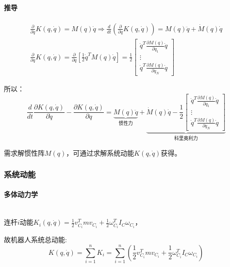 \documentclass[
12pt, %
a4paper, 
oneside, %
headinclude,footinclude, %
]{scrartcl}
\begin{document}
\paragraph{推导}
\begin{align*}
\frac{\partial}{\partial\dot{q}}K(q, \dot{q}) = M(q)\dot{q} \Rightarrow \frac{d}{d t}(\frac{\partial}{\partial\dot{q}}K(q, \dot{q})) = M(q)\ddot{q} + \dot{M}(q)\dot{q} \\
\frac{\partial}{\partial q}K(q,\dot{q}) = \frac{\partial}{\partial q}[\frac{1}{2}\dot{q}^T M(q)\dot{q}] = \frac{1}{2} \begin{bmatrix} \dot{q}^T\frac{\partial M(q)}{\partial q_1}\dot{q} \\ \vdots \\ \dot{q}^T\frac{\partial M(q)}{\partial q_N}\dot{q} \end{bmatrix}
\end{align*}

所以：
$$ \frac{d}{dt}\frac{\partial K(q,\dot{q})}{\partial\dot{q}} - \frac{\partial K(q,\dot{q})}{\partial q} = \underbrace{M(q)\ddot{q}}_{\text{惯性力}} + \underbrace{\dot{M}(q)\dot{q} - \frac{1}{2}\begin{bmatrix} \dot{q}^T\frac{\partial M(q)}{\partial q_1}\dot{q} \\ \vdots \\ \dot{q}^T\frac{\partial M(q)}{\partial q_N}\dot{q} \end{bmatrix}}_{\text{科里奥利力}} $$

需求解惯性阵$ M(q) $，可通过求解系统动能$ K(q, \dot{q}) $获得。
\subsubsection{系统动能}
\paragraph{多体动力学}~\\

连杆$ i $动能$ K_i(q, \dot{q}) = \frac{1}{2}v_{C_i}^T mv_{C_i} + \frac{1}{2}\omega_{C_i}^T I_C\omega_{C_i} $，

故机器人系统总动能:
$$ K(q, \dot{q}) = \sum_{i = 1}^{n} K_i = \sum_{i=1}^{n} (\frac{1}{2}v_{C_i}^T mv_{C_i} + \frac{1}{2}\omega_{C_i}^T I_C\omega_{C_i}) $$
\end{document}
